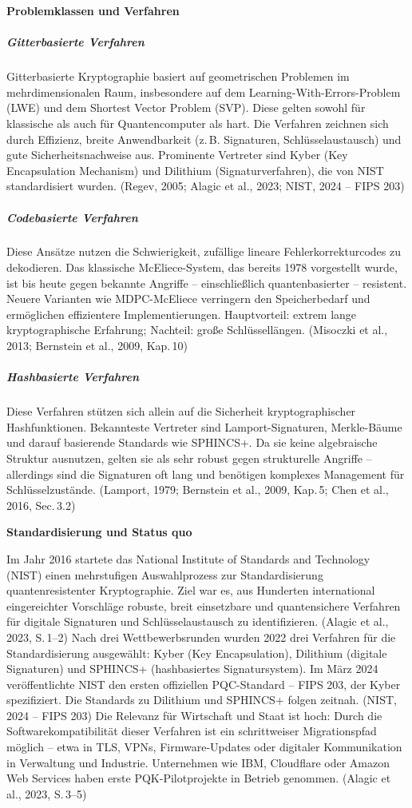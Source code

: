 \vspace{1em}
\noindent\textbf{Problemklassen und Verfahren}
\subparagraph{Gitterbasierte Verfahren}
Gitterbasierte Kryptographie basiert auf geometrischen Problemen im mehrdimensionalen Raum, insbesondere auf dem Learning-With-Errors-Problem (LWE) und dem Shortest Vector Problem (SVP). Diese gelten sowohl für klassische als auch für Quantencomputer als hart. Die Verfahren zeichnen sich durch Effizienz, breite Anwendbarkeit (z. B. Signaturen, Schlüsselaustausch) und gute Sicherheitsnachweise aus. Prominente Vertreter sind Kyber (Key Encapsulation Mechanism) und Dilithium (Signaturverfahren), die von NIST standardisiert wurden.
 (Regev, 2005; Alagic et al., 2023; NIST, 2024 – FIPS 203)
 
\subparagraph{Codebasierte Verfahren}
Diese Ansätze nutzen die Schwierigkeit, zufällige lineare Fehlerkorrekturcodes zu dekodieren. Das klassische McEliece-System, das bereits 1978 vorgestellt wurde, ist bis heute gegen bekannte Angriffe – einschließlich quantenbasierter – resistent. Neuere Varianten wie MDPC-McEliece verringern den Speicherbedarf und ermöglichen effizientere Implementierungen. Hauptvorteil: extrem lange kryptographische Erfahrung; Nachteil: große Schlüssellängen.
 (Misoczki et al., 2013; Bernstein et al., 2009, Kap. 10)
 
\subparagraph{Hashbasierte Verfahren}
Diese Verfahren stützen sich allein auf die Sicherheit kryptographischer Hashfunktionen. Bekannteste Vertreter sind Lamport-Signaturen, Merkle-Bäume und darauf basierende Standards wie SPHINCS+. Da sie keine algebraische Struktur ausnutzen, gelten sie als sehr robust gegen strukturelle Angriffe – allerdings sind die Signaturen oft lang und benötigen komplexes Management für Schlüsselzustände.
 (Lamport, 1979; Bernstein et al., 2009, Kap. 5; Chen et al., 2016, Sec. 3.2)


\vspace{1em}
\noindent\textbf{Standardisierung und Status quo}

\noindent
Im Jahr 2016 startete das National Institute of Standards and Technology (NIST) einen mehrstufigen Auswahlprozess zur Standardisierung quantenresistenter Kryptographie. Ziel war es, aus Hunderten international eingereichter Vorschläge robuste, breit einsetzbare und quantensichere Verfahren für digitale Signaturen und Schlüsselaustausch zu identifizieren.
 (Alagic et al., 2023, S. 1–2)
Nach drei Wettbewerbsrunden wurden 2022 drei Verfahren für die Standardisierung ausgewählt: Kyber (Key Encapsulation), Dilithium (digitale Signaturen) und SPHINCS+ (hashbasiertes Signatursystem). Im März 2024 veröffentlichte NIST den ersten offiziellen PQC-Standard – FIPS 203, der Kyber spezifiziert. Die Standards zu Dilithium und SPHINCS+ folgen zeitnah.
 (NIST, 2024 – FIPS 203)
Die Relevanz für Wirtschaft und Staat ist hoch: Durch die Softwarekompatibilität dieser Verfahren ist ein schrittweiser Migrationspfad möglich – etwa in TLS, VPNs, Firmware-Updates oder digitaler Kommunikation in Verwaltung und Industrie. Unternehmen wie IBM, Cloudflare oder Amazon Web Services haben erste PQK-Pilotprojekte in Betrieb genommen.
 (Alagic et al., 2023, S. 3–5)
 

